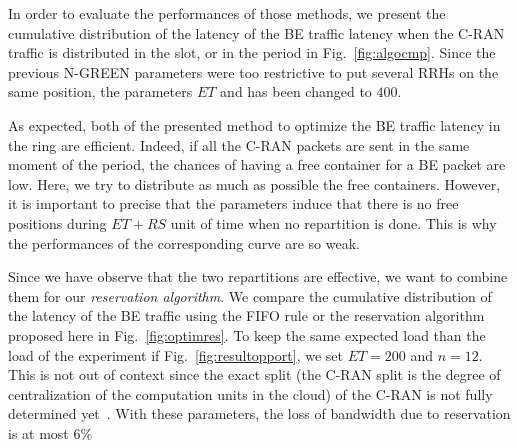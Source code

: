 \documentclass[]{llncs}
\begin{document}
In order to evaluate the performances of those methods, we present the cumulative distribution of the latency of the BE traffic latency when the C-RAN traffic is distributed in the slot, or in the period in Fig.~\ref{fig:algocmp}.
Since the previous N-GREEN parameters were too restrictive to put several RRHs on the same position, the parameters $ET$ and has been changed to $400$.

As expected, both of the presented method to optimize the BE traffic latency in the ring are efficient. Indeed, if all the C-RAN packets are sent in the same moment of the period, the chances of having a free container for a BE packet are low. Here, we try to distribute as much as possible the free containers. However, it is important to precise that the parameters induce that there is no free positions during $ET+RS$ unit of time when no repartition is done. This is why the performances of the corresponding curve are so weak.

Since we have observe that the two repartitions are effective, we want to combine them for our {\em reservation algorithm}.  We compare the cumulative distribution of the latency of the BE traffic using the FIFO rule or the reservation algorithm proposed here in Fig.~\ref{fig:optimres}. To keep the same expected load than the load of the experiment if Fig.~\ref{fig:resultopport}, we set $ET = 200$ and $n = 12$. This is not out of context since the exact split (the C-RAN split is the degree of centralization of the computation units in the cloud) of the C-RAN is not fully determined yet~\cite{mobile2011c}. With these parameters, the loss of bandwidth due to reservation is at most $6\%$
 
\end{document}
